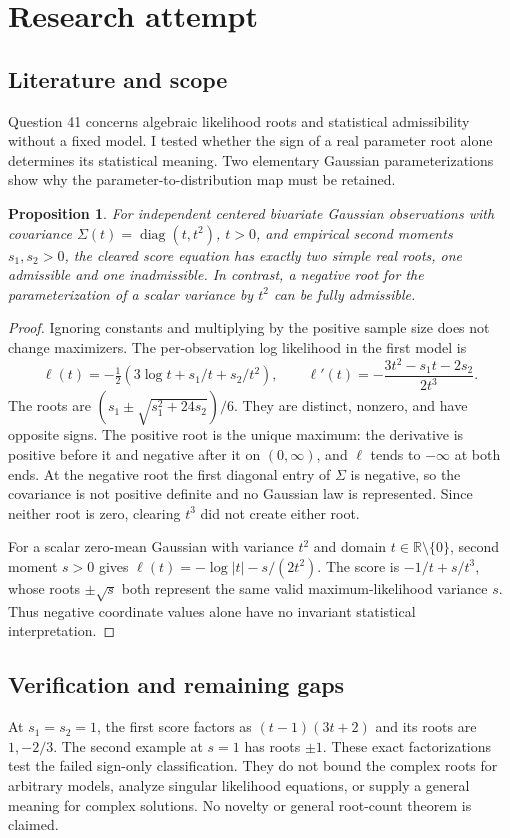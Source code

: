 \documentclass[11pt]{article}
\newtheorem{proposition}{Proposition}
\begin{document}
\section{Research attempt}
\subsection{Literature and scope}
Question 41 concerns algebraic likelihood roots and statistical admissibility without a fixed model. I tested whether the sign of a real parameter root alone determines its statistical meaning. Two elementary Gaussian parameterizations show why the parameter-to-distribution map must be retained.
\begin{proposition}
For independent centered bivariate Gaussian observations with covariance $\Sigma(t)=\operatorname{diag}(t,t^2)$, $t>0$, and empirical second moments $s_1,s_2>0$, the cleared score equation has exactly two simple real roots, one admissible and one inadmissible. In contrast, a negative root for the parameterization of a scalar variance by $t^2$ can be fully admissible.
\end{proposition}
\begin{proof}
Ignoring constants and multiplying by the positive sample size does not change maximizers. The per-observation log likelihood in the first model is
\[
\ell(t)=-\tfrac12(3\log t+s_1/t+s_2/t^2),\qquad
\ell'(t)=-\frac{3t^2-s_1t-2s_2}{2t^3}.
\]
The roots are $(s_1\pm\sqrt{s_1^2+24s_2})/6$. They are distinct, nonzero, and have opposite signs. The positive root is the unique maximum: the derivative is positive before it and negative after it on $(0,\infty)$, and $\ell$ tends to $-\infty$ at both ends. At the negative root the first diagonal entry of $\Sigma$ is negative, so the covariance is not positive definite and no Gaussian law is represented. Since neither root is zero, clearing $t^3$ did not create either root.

For a scalar zero-mean Gaussian with variance $t^2$ and domain $t\in\mathbb R\setminus\{0\}$, second moment $s>0$ gives $\ell(t)=-\log|t|-s/(2t^2)$. The score is $-1/t+s/t^3$, whose roots $\pm\sqrt{s}$ both represent the same valid maximum-likelihood variance $s$. Thus negative coordinate values alone have no invariant statistical interpretation.
\end{proof}
\subsection{Verification and remaining gaps}
At $s_1=s_2=1$, the first score factors as $(t-1)(3t+2)$ and its roots are $1,-2/3$. The second example at $s=1$ has roots $\pm1$. These exact factorizations test the failed sign-only classification. They do not bound the complex roots for arbitrary models, analyze singular likelihood equations, or supply a general meaning for complex solutions. No novelty or general root-count theorem is claimed.
\end{document}
